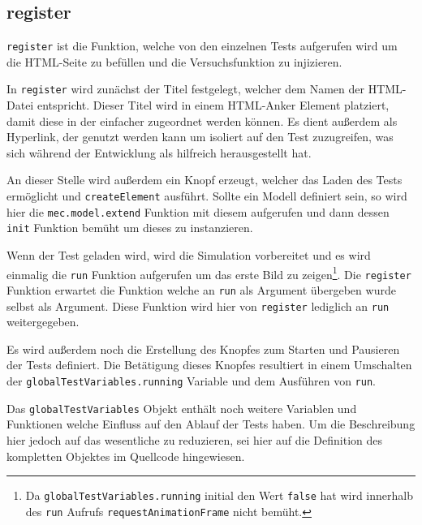 \subsection{register}\label{ch:gtv_register}

\lstinline{register} ist die Funktion, welche von den einzelnen Tests aufgerufen wird um die HTML-Seite zu befüllen und die Versuchsfunktion zu injizieren.

In \lstinline{register} wird zunächst der Titel festgelegt, welcher dem Namen der HTML-Datei entspricht.
Dieser Titel wird in einem HTML-Anker Element %
platziert, damit diese in der  einfacher zugeordnet werden können.
Es dient außerdem als Hyperlink, der genutzt werden kann um isoliert auf den Test zuzugreifen, was sich während der Entwicklung als hilfreich herausgestellt hat.

An dieser Stelle wird außerdem ein Knopf erzeugt, welcher das Laden des Tests ermöglicht und \lstinline{createElement} ausführt.
Sollte ein  Modell definiert sein, so wird hier die \lstinline{mec.model.extend} Funktion mit diesem aufgerufen und dann dessen \lstinline{init} Funktion bemüht um dieses zu instanzieren.

Wenn der Test geladen wird, wird die Simulation vorbereitet und es wird einmalig die \lstinline{run} Funktion aufgerufen um das erste Bild zu zeigen\footnote{Da \lstinline{globalTestVariables.running} initial den Wert \lstinline{false} hat wird innerhalb des \lstinline{run} Aufrufs \lstinline{requestAnimationFrame} nicht bemüht.}.
Die \lstinline{register} Funktion erwartet die Funktion welche an \lstinline{run} als Argument übergeben wurde selbst als Argument.
Diese Funktion wird hier von \lstinline{register} lediglich an \lstinline{run} weitergegeben.

Es wird außerdem noch die Erstellung des Knopfes zum Starten und Pausieren der Tests definiert.
Die Betätigung dieses Knopfes resultiert in einem Umschalten der \lstinline{globalTestVariables.running} Variable und dem Ausführen von \lstinline{run}.

Das \lstinline{globalTestVariables} Objekt enthält noch weitere Variablen und Funktionen welche Einfluss auf den Ablauf der Tests haben.
Um die Beschreibung hier jedoch auf das wesentliche zu reduzieren, sei hier auf die Definition des kompletten Objektes im Quellcode %
hingewiesen.


